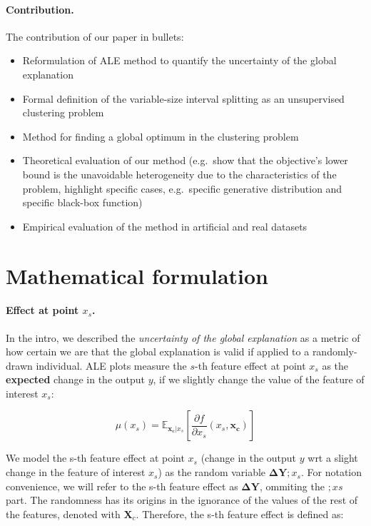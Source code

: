 \documentclass{article}
\newcommand{\dfdx}{\frac{\partial f}{\partial x_s}}
\newcommand{\xc}{\mathbf{x_c}}
\newcommand{\DY}{\mathbf{\Delta Y}}
\begin{document}
\paragraph{Contribution.} The contribution of our
paper in bullets:

\begin{itemize}
\item Reformulation of ALE method to quantify the uncertainty of the
  global explanation
\item Formal definition of the variable-size interval splitting as an
  unsupervised clustering problem
\item Method for finding a global optimum in the clustering
  problem
\item Theoretical evaluation of our method (e.g.~show that the
  objective's lower bound is the unavoidable heterogeneity due to the
  characteristics of the problem, highlight specific cases,
  e.g.\ specific generative distribution and specific black-box function)
\item Empirical evaluation of the method in artificial and real
  datasets
\end{itemize}

\section{Mathematical formulation}
\label{sec:mathematical-formulation}

\paragraph{Effect at point \(x_s\).} In the intro, we described the
\textit{uncertainty of the global explanation} as a metric of how
certain we are that the global explanation is valid if applied to a
randomly-drawn individual.
ALE plots measure the \(s\)-th feature
effect at point \(x_s\) as the \textbf{expected} change in the output \(y\), if
we slightly change the value of the feature of interest \(x_s\):

\begin{equation}
  \label{eq:ALE_mean}
  \mu(x_s) = \mathbb{E}_{\xc|x_s}\left [\dfdx (x_s, \xc)\right ]
\end{equation}

\noindent
We model the s-th feature effect at point \(x_s\) (change in the output \(y\) wrt a slight change in the feature of interest \(x_s\)) as the random variable $\DY ; x_s $.
For notation convenience, we will refer to the s-th feature effect as \(\DY\), ommiting the \(;xs\) part.
The randomness has its origins in the ignorance of the values of the rest of the features, denoted with \(\mathbf{X}_c\).
Therefore, the s-th feature effect is defined as:
\end{document}

